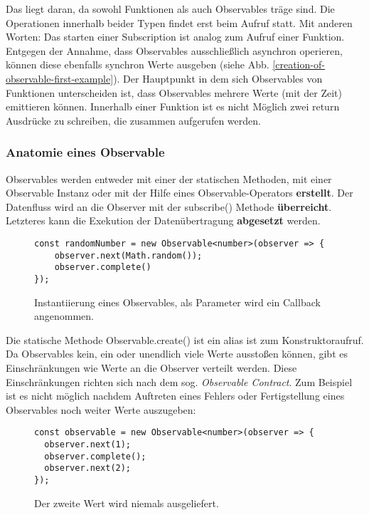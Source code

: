 \noindent
Das liegt daran, da sowohl Funktionen als auch Observables träge sind. Die Operationen innerhalb beider Typen findet erst beim Aufruf statt. Mit anderen Worten: Das starten einer Subscription ist analog zum Aufruf einer Funktion. Entgegen der Annahme, dass Observables ausschließlich asynchron operieren, können diese ebenfalls synchron Werte ausgeben (siehe Abb. \ref{creation-of-observable-first-example}). Der Hauptpunkt in dem sich Observables von Funktionen unterscheiden ist, dass Observables mehrere Werte (mit der Zeit) emittieren können. Innerhalb einer Funktion ist es nicht Möglich zwei return Ausdrücke zu schreiben, die zusammen aufgerufen werden.

\subsubsection{Anatomie eines Observable}
Observables werden entweder mit einer der statischen Methoden, mit einer Observable Instanz oder mit der Hilfe eines Observable-Operators \textbf{erstellt}. Der Datenfluss wird an die Observer mit der subscribe() Methode \textbf{überreicht}. Letzteres kann die Exekution der Datenübertragung \textbf{abgesetzt} werden.

\begin{figure}[H]
\begin{lstlisting}[basicstyle=\small]
const randomNumber = new Observable<number>(observer => {
    observer.next(Math.random());
    observer.complete()
});
\end{lstlisting}
\caption{Instantiierung eines Observables, als Parameter wird ein Callback angenommen.}
\end{figure}

\noindent
Die statische Methode Observable.create() ist ein alias ist zum Konstruktoraufruf. Da Observables kein, ein oder unendlich viele Werte ausstoßen können, gibt es Einschränkungen wie Werte an die Observer verteilt werden. Diese Einschränkungen richten sich nach dem sog. \textit{Observable Contract}. Zum Beispiel ist es nicht möglich nachdem Auftreten eines Fehlers oder Fertigstellung eines Observables noch weiter Werte auszugeben:

\begin{figure}[H]
\begin{lstlisting}[basicstyle=\small]
const observable = new Observable<number>(observer => {
  observer.next(1);
  observer.complete();
  observer.next(2);
});
\end{lstlisting}
\caption{Der zweite Wert wird niemals ausgeliefert.}
\end{figure}

